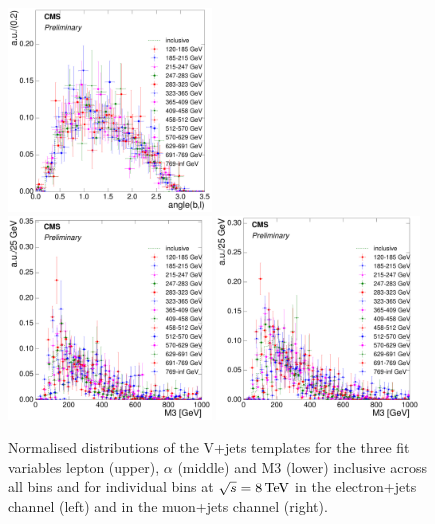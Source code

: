 \begin{figure}[hbtp]
     \includegraphics[width=0.48\textwidth]{Chapters/04_Analysis/04b_XSections/images/8TeV/fit_variables/muon/HT/angle_bl/vjets/HT_angle_bl_2orMoreBtags_VJets_template_comparison.pdf}\\
     \includegraphics[width=0.48\textwidth]{Chapters/04_Analysis/04b_XSections/images/8TeV/fit_variables/electron/HT/M3/vjets/HT_M3_2orMoreBtags_VJets_template_comparison.pdf}\hfill
     \includegraphics[width=0.48\textwidth]{Chapters/04_Analysis/04b_XSections/images/8TeV/fit_variables/muon/HT/M3/vjets/HT_M3_2orMoreBtags_VJets_template_comparison.pdf}\\
	 \caption[Normalised distributions of the V+jets templates for the three fit variables in \HT
	 bins at $\sqrt{s}=8\TeV$.]{Normalised distributions of the V+jets templates for the three fit variables
	 lepton \abseta (upper), $\alpha$ (middle) and M3 (lower) inclusive across all \HT bins and for individual
	 \HT bins at $\sqrt{s}=8\TeV$ in the electron+jets channel (left) and in the muon+jets channel (right).}
     \label{fig:HT_fit_variable_vjets_comparisons_8TeV}
\end{figure}

